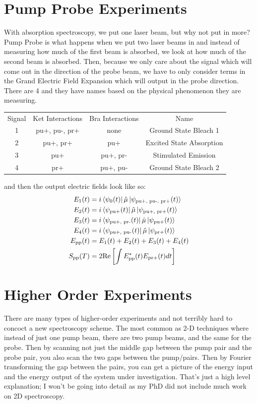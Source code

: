 \section{Pump Probe Experiments}
With absorption spectroscopy, we put one laser beam, but why not put in more?  Pump Probe is what happens when we put two laser beams in and instead of measuring how much of the first beam is absorbed, we look at how much of the second beam is absorbed.  Then, because we only care about the signal which will come out in the direction of the probe beam, we have to only consider terms in the Grand Electric Field Expansion which will output in the probe direction.  There are 4 and they have names based on the physical phenomenon they are measuring.
\begin{tabular}{cccc}
Signal & Ket Interactions & Bra Interactions & Name \\
1 & pu+, pu-, pr+ & none & Ground State Bleach 1 \\
2 & pu+, pr+ & pu+ & Excited State Absorption \\
3 & pu+ & pu+, pr- & Stimulated Emission \\
4 & pr+ & pu+, pu- & Ground State Bleach 2
\end{tabular}
and then the output electric fields look like so:
\begin{align}
	E_1 (t) &=  i \bra{\psi_{0} (t)} \hat{\mu} \ket{\psi_{\text{pu+, pu-, pr+}} (t)}\\
	E_2 (t) &=  i \bra{\psi_{\text{pu+}} (t)} \hat{\mu} \ket{\psi_{\text{pu+, pr+}} (t)}\\
	E_3 (t) &=  i \bra{\psi_{\text{pu+, pr-}} (t)} \hat{\mu} \ket{\psi_{\text{pu+}} (t)}\\
	E_4 (t) &=  i \bra{\psi_{\text{pu+, pu-}} (t)} \hat{\mu} \ket{\psi_{\text{pr+}} (t)} \\
	E_{\text{pp}} (t) &= E_1(t)  + E_2(t)  + E_3(t)  + E_4(t)  \\
	S_{\text{pp}} (T) &= 2 \text{Re} \left[ \int E^*_{\text{pp}} (t) E_{\text{pr+}} (t) dt  \right]
\end{align}

\section{Higher Order Experiments}

There are many types of higher-order experiments and not terribly hard to concoct a new spectroscopy scheme.  The most common as 2-D techniques where instead of just one pump beam, there are two pump beams, and the same for the probe.  Then by scanning not just the middle gap between the pump pair and the probe pair, you also scan the two gaps between the pump/pairs.  Then by Fourier transforming the gap between the pairs, you can get a picture of the energy input and the energy output of the system under investigation.  That's just a high level explanation; I won't be going into detail as my PhD did not include much work on 2D spectroscopy.

